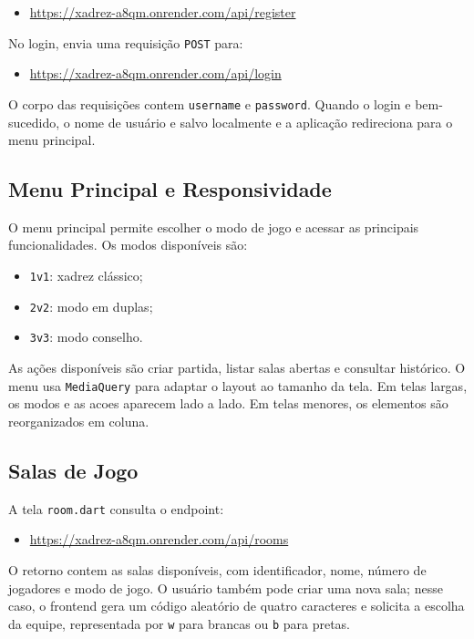 \documentclass[12pt]{article}
\begin{document}
\begin{itemize}
    \item \url{https://xadrez-a8qm.onrender.com/api/register}
\end{itemize}

No login, envia uma requisição \texttt{POST} para:

\begin{itemize}
    \item \url{https://xadrez-a8qm.onrender.com/api/login}
\end{itemize}

O corpo das requisições contem \texttt{username} e \texttt{password}. Quando o login e bem-sucedido, o nome de usuário e salvo localmente e a aplicação redireciona para o menu principal.

\subsection{Menu Principal e Responsividade}

O menu principal permite escolher o modo de jogo e acessar as principais funcionalidades. Os modos disponíveis são:

\begin{itemize}
    \item \texttt{1v1}: xadrez clássico;
    \item \texttt{2v2}: modo em duplas;
    \item \texttt{3v3}: modo conselho.
\end{itemize}

As ações disponíveis são criar partida, listar salas abertas e consultar histórico. O menu usa \texttt{MediaQuery} para adaptar o layout ao tamanho da tela. Em telas largas, os modos e as acoes aparecem lado a lado. Em telas menores, os elementos são reorganizados em coluna.

\subsection{Salas de Jogo}

A tela \texttt{room.dart} consulta o endpoint:

\begin{itemize}
    \item \url{https://xadrez-a8qm.onrender.com/api/rooms}
\end{itemize}

O retorno contem as salas disponíveis, com identificador, nome, número de jogadores e modo de jogo. O usuário também pode criar uma nova sala; nesse caso, o frontend gera um código aleatório de quatro caracteres e solicita a escolha da equipe, representada por \texttt{w} para brancas ou \texttt{b} para pretas.
\end{document}
